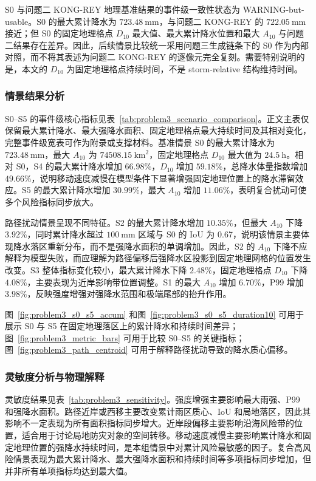 S0 与问题二 KONG-REY 地理基准结果的事件级一致性状态为 WARNING-but-usable。S0 的最大累计降水为 $723.48\ \mathrm{mm}$，与问题二 KONG-REY 的 $722.05\ \mathrm{mm}$ 接近；但 S0 的固定地理格点 $D_{10}$ 最大值、最大累计降水位置和最大 $A_{10}$ 与问题二结果存在差异。因此，后续情景比较统一采用问题三生成链条下的 S0 作为内部对照，而不将其表述为问题二 KONG-REY 的逐像元完全复刻。需要特别说明的是，本文的 $D_{10}$ 为固定地理格点持续时间，不是 storm-relative 结构维持时间。

\subsubsection{情景结果分析}

S0--S5 的事件级核心指标见表~\ref{tab:problem3_scenario_comparison}。正文主表仅保留最大累计降水、最大强降水面积、固定地理格点最大持续时间及其相对变化，完整事件级宽表可作为附录或支撑材料。基准情景 S0 的最大累计降水为 $723.48\ \mathrm{mm}$，最大 $A_{10}$ 为 $74508.15\ \mathrm{km^2}$，固定地理格点 $D_{10}$ 最大值为 $24.5\ \mathrm{h}$。相对 S0，S4 的最大累计降水增加 $66.98\%$，$D_{10}$ 增加 $59.18\%$，总降水体量指数增加 $49.66\%$，说明移动速度减慢在模型条件下显著增强固定地理位置上的降水滞留效应。S5 的最大累计降水增加 $30.99\%$，最大 $A_{10}$ 增加 $11.06\%$，表明复合扰动可使多个风险指标同步放大。

路径扰动情景呈现不同特征。S2 的最大累计降水增加 $10.35\%$，但最大 $A_{10}$ 下降 $3.92\%$，同时累计降水超过 $100\ \mathrm{mm}$ 区域与 S0 的 IoU 为 0.67，说明该情景主要体现降水落区重新分布，而不是强降水面积的单调增加。因此，S2 的 $A_{10}$ 下降不应解释为模型失败，而应理解为路径偏移后强降水区投影到固定地理网格的位置发生改变。S3 整体指标变化较小，最大累计降水下降 $2.48\%$，固定地理格点 $D_{10}$ 下降 $4.08\%$，主要表现为近岸影响带位置调整。S1 的最大 $A_{10}$ 增加 $6.70\%$，P99 增加 $3.98\%$，反映强度增强对强降水范围和极端尾部的抬升作用。

图~\ref{fig:problem3_s0_s5_accum} 和图~\ref{fig:problem3_s0_s5_duration10} 可用于展示 S0 与 S5 在固定地理落区上的累计降水和持续时间差异；图~\ref{fig:problem3_metric_bars} 可用于比较 S0--S5 的关键指标；图~\ref{fig:problem3_path_centroid} 可用于解释路径扰动导致的降水质心偏移。

\subsubsection{灵敏度分析与物理解释}

灵敏度结果见表~\ref{tab:problem3_sensitivity}。强度增强主要影响最大雨强、P99 和强降水面积。路径近岸或西移主要改变累计雨区质心、IoU 和局地落区，因此其影响不一定表现为所有面积指标同步增大。近岸段偏移主要影响沿海风险带的位置，适合用于讨论局地防灾对象的空间转移。移动速度减慢主要影响累计降水和固定地理位置的强降水持续时间，是本组情景中对累计风险最敏感的因子。复合高风险情景表现为最大累计降水、最大强降水面积和持续时间等多项指标同步增加，但并非所有单项指标均达到最大值。


